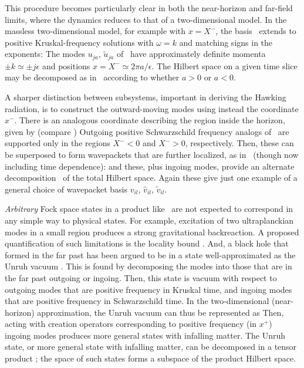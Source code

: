 This procedure becomes particularly clear in both the near-horizon and far-field limits, where the dynamics reduces to that of a two-dimensional model.  In the massless two-dimensional model, for example with $x=X^-$, the basis \planebase\ extends to 
 positive Kruskal-frequency solutions with $\omega=k$ and matching signs in the exponents:
%
\eqn{}
%
The modes $u_{ja}$, ${\tilde u}_{ja}$ of \uki\ have approximately definite momenta $\pm k\simeq\pm j\epsilon$ and positions $x=X^-\simeq 2\pi a/\epsilon$.  The Hilbert space on a given time slice may be decomposed as in \hprod\ according to whether $a>0$ or $a<0$.

A sharper distinction between subsystems, important in deriving the Hawking radiation, is to construct the outward-moving modes using instead the coordinate $x^-$.  There is an analogous coordinate describing the region inside the horizon, given by (compare \Kruskdef)
%
\eqn{}
%
Outgoing positive Schwarzschild frequency analogs of \kruskbasis\ are 
%
\eqn{}
% 
supported only in the regions $X^-<0$ and $X^->0$, respectively.  Then, these can be superposed to form wavepackets that are further localized, as in \uki\ (though now including time dependence):
%
\eqn{}
%
and these, plus ingoing modes, provide an alternate decomposition \hprod\ of the total Hilbert space.  Again these give just one example of a general choice of wavepacket basis $v_{il}$, ${\hat v}_{il}$, ${\tilde v}_{il}$.

{\it Arbitrary} Fock space states in a product like \hprod\ are not expected to correspond in any simple way to physical states. For example, excitation of two ultraplanckian modes in a small region produces a strong gravitational backreaction.  A proposed quantification of such limitations is the locality bound .  
And, a black hole that formed in the far past has been argued to be in a state well-approximated as the Unruh vacuum . This is found by decomposing the modes into those that are in the far past outgoing or ingoing. Then, this state is vacuum with respect to outgoing modes that are positive frequency in Kruskal time, and ingoing modes that are positive frequency in Schwarzschild time. 
In the two-dimensional (near-horizon) approximation, the Unruh vacuum can thus be represented as 
%
\eqn{}
%
Then, acting with creation operators corresponding to positive frequency (in $x^+$)  ingoing modes produces more general states with infalling matter. The Unruh state, or more general state with infalling matter, can be decomposed in a tensor product \hprod; the space of such states forms a subspace of the product Hilbert space.



